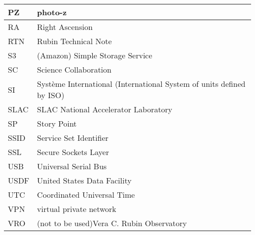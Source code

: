 \begin{longtable}{p{}p{}}
PZ & photo-z \\\hline
RA & Right Ascension \\\hline
RTN & Rubin Technical Note \\\hline
S3 & (Amazon) Simple Storage Service \\\hline
SC & Science Collaboration \\\hline
SI & Syst\`eme International (International System of units defined by ISO) \\\hline
SLAC & SLAC National Accelerator Laboratory \\\hline
SP & Story Point \\\hline
SSID & Service Set Identifier \\\hline
SSL & Secure Sockets Layer \\\hline
USB & Universal Serial Bus \\\hline
USDF & United States Data Facility \\\hline
UTC & Coordinated Universal Time \\\hline
VPN & virtual private network \\\hline
VRO & (not to be used)Vera C. Rubin Observatory \\\hline
\end{longtable}
